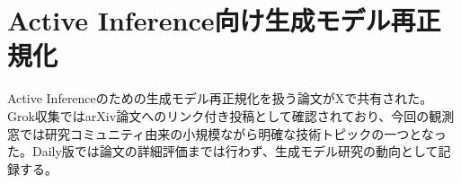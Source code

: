 \section{Active Inference向け生成モデル再正規化}
Active Inferenceのための生成モデル再正規化を扱う論文がXで共有された。Grok収集ではarXiv論文へのリンク付き投稿として確認されており、今回の観測窓では研究コミュニティ由来の小規模ながら明確な技術トピックの一つとなった。Daily版では論文の詳細評価までは行わず、生成モデル研究の動向として記録する。
